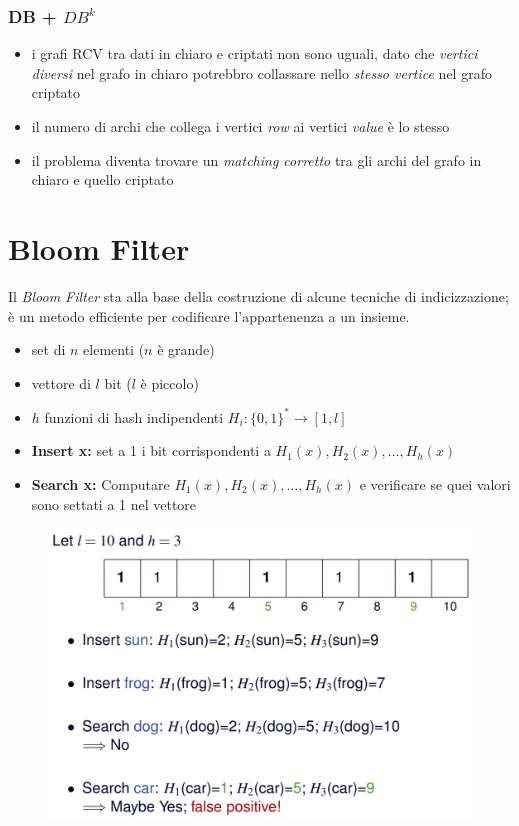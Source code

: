 \documentclass{report}
\begin{document}
\subsubsection{DB + $DB^k$}
\begin{itemize}
    \item i grafi RCV tra dati in chiaro e criptati non sono uguali, dato che \textit{vertici diversi} nel grafo in chiaro 
    potrebbro collassare nello \textit{stesso vertice} nel grafo criptato
    \item il numero di archi che collega i vertici \textit{row} ai vertici \textit{value} è lo stesso
    \item il problema diventa trovare un \textit{matching corretto} tra gli archi del grafo in chiaro e quello criptato
\end{itemize}

\newpage
\section{Bloom Filter}
Il \textit{Bloom Filter} sta alla base della costruzione di alcune tecniche 
di indicizzazione; è un metodo efficiente per codificare l'appartenenza a un insieme.

\begin{itemize}
    \item set di $n$ elementi ($n$ è grande)
    \item vettore di $l$ bit ($l$ è piccolo)
    \item $h$ funzioni di hash indipendenti $H_i : \{0,1\}^* \rightarrow [1,l]$
    \item \textbf{Insert x:} set a 1 i bit corrispondenti a $H_1(x), H_2(x), \dots, H_h(x)$
    \item \textbf{Search x:} Computare $H_1(x), H_2(x), \dots, H_h(x)$ e verificare se quei valori sono settati a 1 nel vettore
\end{itemize}

\begin{figure}[ht]
    \centering
    \includegraphics[width=0.8\linewidth]{images/encryption/bloom-filter.png}
\end{figure}
\end{document}
